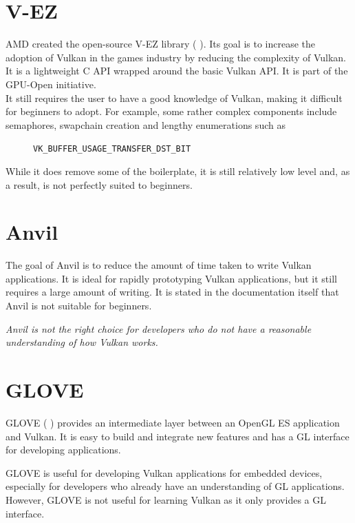 \documentclass[12pt]{report}
\newcommand{\citenoparen}[1]{\citeauthor{#1} \citeyear{#1}}
\newcommand{\citesoftware}[1]{(\citeauthor{#1} \citeyear{#1})}
\newcommand{\quotebu}[2]
{
  \begin{displayquote}[\citenoparen{#2}]
    \textit{#1}
  \end{displayquote}
}
\theoremstyle{definition}
\begin{document}
    \section{V-EZ}

      AMD created the open-source V-EZ library \citesoftware{vez}. Its goal is to increase the
      adoption of Vulkan in the games industry by reducing the complexity of
      Vulkan. It is a lightweight C API wrapped around the basic Vulkan API.
      It is part of the GPU-Open initiative. \\
      
      It still requires the user to have a good knowledge of Vulkan, making it
      difficult for beginners to adopt. For example, some rather complex
      components include semaphores, swapchain creation and lengthy
      enumerations such as

        \begin{figure}[h!]
        \centering
        \verb|VK_BUFFER_USAGE_TRANSFER_DST_BIT|
        \end{figure}

      While it does remove some of the boilerplate, it is still relatively low
      level and, as a result, is not perfectly suited to beginners.

    \section{Anvil}

      The goal of Anvil is to reduce the amount of time taken to write Vulkan
      applications. It is ideal for rapidly prototyping Vulkan applications,
      but it still requires a large amount of writing. It is stated in the
      documentation itself that Anvil is not suitable for beginners.

      \quotebu{
        Anvil is not the right choice for developers who do not have a
        reasonable understanding of how Vulkan works.
      }{anvil}

    \section{GLOVE}

      GLOVE \citesoftware{glove} provides an intermediate layer
      between an OpenGL ES application and Vulkan. It is easy to build and
      integrate new features and has a GL interface for developing applications.

      GLOVE is useful for developing Vulkan applications for embedded devices,
      especially for developers who already have an understanding of GL
      applications. However, GLOVE is not useful for learning Vulkan
      as it only provides a GL interface.
\end{document}

